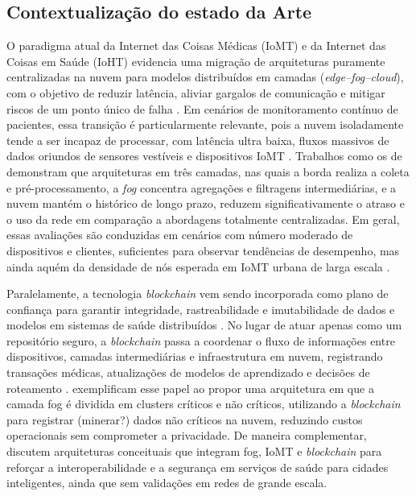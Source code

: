 \documentclass[12pt]{article}
\begin{document}
\subsection{Contextualização do estado da Arte}

O paradigma atual da Internet das Coisas Médicas (IoMT) e da Internet das Coisas em Saúde (IoHT) evidencia uma migração de arquiteturas puramente centralizadas na nuvem para modelos distribuídos em camadas (\textit{edge–fog–cloud}), com o objetivo de reduzir latência, aliviar gargalos de comunicação e mitigar riscos de um ponto único de falha \cite{rajagopal2025,tripathy2024,ahmad2023}. Em cenários de monitoramento contínuo de pacientes, essa transição é particularmente relevante, pois a nuvem isoladamente tende a ser incapaz de processar, com latência ultra baixa, fluxos massivos de dados oriundos de sensores vestíveis e dispositivos IoMT \cite{rajagopal2025,tripathy2024,baucas2023}. Trabalhos como os de \cite{rajagopal2025,tripathy2024} demonstram que arquiteturas em três camadas, nas quais a borda realiza a coleta e pré-processamento, a \textit{fog} concentra agregações e filtragens intermediárias, e a nuvem mantém o histórico de longo prazo, reduzem significativamente o atraso e o uso da rede em comparação a abordagens totalmente centralizadas. Em geral, essas avaliações são conduzidas em cenários com número moderado de dispositivos e clientes, suficientes para observar tendências de desempenho, mas ainda aquém da densidade de nós esperada em IoMT urbana de larga escala \cite{rajagopal2025,tripathy2024,baucas2023}.

Paralelamente, a tecnologia \textit{blockchain} vem sendo incorporada como plano de confiança para garantir integridade, rastreabilidade e imutabilidade de dados e modelos em sistemas de saúde distribuídos \cite{ahmad2023,kamruzzaman2022,alam2022,baucas2023}. No lugar de atuar apenas como um repositório seguro, a \textit{blockchain} passa a coordenar o fluxo de informações entre dispositivos, camadas intermediárias e infraestrutura em nuvem, registrando transações médicas, atualizações de modelos de aprendizado e decisões de roteamento \cite{ahmad2023,alam2022,baucas2023}. \cite{ahmad2023} exemplificam esse papel ao propor uma arquitetura em que a camada fog é dividida em clusters críticos e não críticos, utilizando a \textit{blockchain} para registrar (minerar?) dados não críticos na nuvem, reduzindo custos operacionais sem comprometer a privacidade. De maneira complementar, \cite{kamruzzaman2022,alam2022} discutem arquiteturas conceituais que integram fog, IoMT e \textit{blockchain} para reforçar a interoperabilidade e a segurança em serviços de saúde para cidades inteligentes, ainda que sem validações em redes de grande escala.
\end{document}
